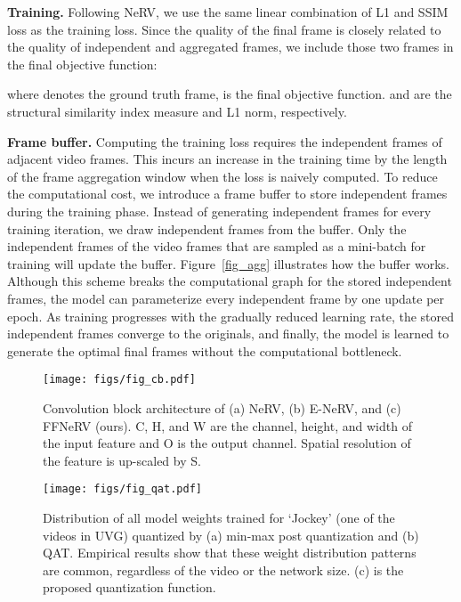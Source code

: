 \documentclass[sigconf]{acmart}
\begin{document}
\noindent\textbf{Training.} Following NeRV, we use the same linear combination of L1 and SSIM loss as the training loss.
Since the quality of the final frame is closely related to the quality of independent and aggregated frames, we include those two frames in the final objective function:
\begin{small}

\end{small}
where  denotes the ground truth frame,  is the final objective function.  and  are the structural similarity index measure and L1 norm, respectively.

\noindent\textbf{Frame buffer.}
Computing the training loss requires the independent frames of adjacent video frames.
This incurs an increase in the training time by the length of the frame aggregation window when the loss is naively computed.
To reduce the computational cost, we introduce a frame buffer to store independent frames during the training phase.
Instead of generating independent frames for every training iteration, we draw independent frames from the buffer.
Only the independent frames of the video frames that are sampled as a mini-batch for training will update the buffer.
Figure~\ref{fig_agg} illustrates how the buffer works.
Although this scheme breaks the computational graph for the stored independent frames, the model can parameterize every independent frame by one update per epoch.
As training progresses with the gradually reduced learning rate, the stored independent frames converge to the originals, and finally, the model is learned to generate the optimal final frames without the computational bottleneck.





\begin{figure}[t]
\begin{center}
\texttt{[image: figs/fig\_cb.pdf]}
\end{center}
   \caption{Convolution block architecture of (a) NeRV, (b) E-NeRV, and (c) FFNeRV (ours). C, H, and W are the channel, height, and width of the input feature and O is the output channel. Spatial resolution of the feature is up-scaled by S.}
\label{fig_cb}
\end{figure}

\begin{figure}[t]
\begin{center}
\texttt{[image: figs/fig\_qat.pdf]}
\end{center}
   \caption{Distribution of all model weights trained for `Jockey' (one of the videos in UVG) quantized by (a) min-max post quantization and (b) QAT.
Empirical results show that these weight distribution patterns are common, regardless of the video or the network size.
   (c) is the proposed quantization function. }
\label{fig_qat}
\end{figure}
\end{document}
